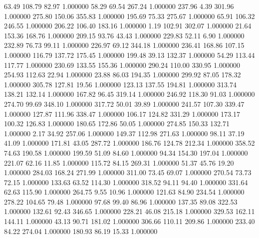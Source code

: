      63.49    108.79     82.97  1.000000
     58.29     69.54    267.24  1.000000
    237.96      4.39    301.96  1.000000
    275.80    150.06    355.83  1.000000
    195.69     75.33    275.67  1.000000
     65.91    106.32    246.55  1.000000
    206.22    106.40    183.16  1.000000
      1.19    102.91    302.07  1.000000
     21.64    153.36    168.76  1.000000
    209.15     93.76     43.43  1.000000
    229.83     52.11      6.90  1.000000
    232.89     76.73     99.11  1.000000
    226.97     69.12    344.18  1.000000
    236.41    168.86    107.15  1.000000
    116.79    137.72    175.45  1.000000
    199.48     39.13    132.37  1.000000
     54.29    113.44    117.77  1.000000
    230.69    133.55    155.36  1.000000
    290.24    110.00    330.95  1.000000
    254.93    112.63     22.94  1.000000
     23.88     86.03    194.35  1.000000
    299.92     87.05    178.32  1.000000
    305.78    127.81     19.56  1.000000
    123.13    137.55    194.81  1.000000
    313.74    138.21    132.14  1.000000
    167.82     96.45    319.14  1.000000
    246.92    118.30     91.03  1.000000
    274.70     99.69    348.10  1.000000
    317.72     50.01     39.89  1.000000
    241.57    107.30    339.47  1.000000
    127.87    111.96    338.47  1.000000
    106.17    124.82    331.29  1.000000
    173.17    100.32    126.83  1.000000
    180.65    172.86     50.05  1.000000
    274.85    150.33    132.71  1.000000
      2.17     34.92    257.06  1.000000
    149.37    112.98    271.63  1.000000
     98.11     37.19     41.09  1.000000
    171.81     43.05    287.72  1.000000
    186.76    124.78    212.34  1.000000
    358.52     74.63    190.58  1.000000
    199.59     51.09     84.60  1.000000
     94.34    154.30    197.04  1.000000
    221.07     62.16     11.85  1.000000
    115.72     84.15    269.31  1.000000
     51.37     45.76     19.20  1.000000
    284.03    168.24    271.99  1.000000
    311.00     73.45     69.07  1.000000
    270.54     73.73     72.15  1.000000
    133.63     63.52    114.30  1.000000
    318.52     94.11     94.40  1.000000
    331.64     62.63    115.90  1.000000
    264.75      9.55     10.96  1.000000
    121.63     84.90    234.54  1.000000
    278.22    104.65     79.48  1.000000
     97.68     99.40     86.96  1.000000
    137.35     89.08    322.53  1.000000
    132.61     92.43    346.65  1.000000
    228.21     46.08    215.18  1.000000
    329.53    162.11    144.11  1.000000
     43.13     90.71    181.02  1.000000
    306.66    110.11    209.86  1.000000
    233.40     84.22    274.04  1.000000
    180.93     86.19     15.33  1.000000

